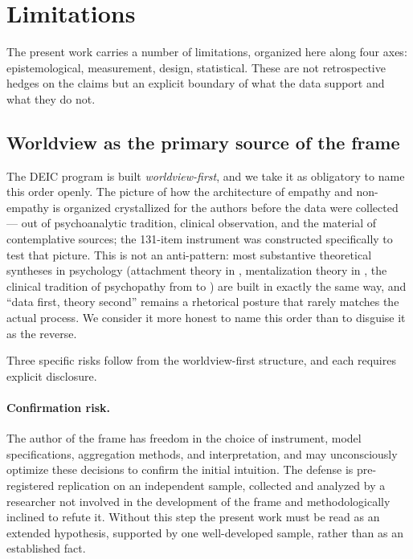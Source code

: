 \section{Limitations}
\label{sec:limitations}

The present work carries a number of limitations, organized here along four axes: epistemological, measurement, design, statistical. These are not retrospective hedges on the claims but an explicit boundary of what the data support and what they do not.

\subsection{Worldview as the primary source of the frame}
\label{subsec:worldview_first}

The DEIC program is built \emph{worldview-first}, and we take it as obligatory to name this order openly. The picture of how the architecture of empathy and non-empathy is organized crystallized for the authors before the data were collected --- out of psychoanalytic tradition, clinical observation, and the material of contemplative sources; the 131-item instrument was constructed specifically to test that picture. This is not an anti-pattern: most substantive theoretical syntheses in psychology (attachment theory in \citealp{bowlby1969}, mentalization theory in \citealp{fonagy2002}, the clinical tradition of psychopathy from \citealp{cleckley1941} to \citealp{hare1991}) are built in exactly the same way, and ``data first, theory second'' remains a rhetorical posture that rarely matches the actual process. We consider it more honest to name this order than to disguise it as the reverse.

Three specific risks follow from the worldview-first structure, and each requires explicit disclosure.

\paragraph{Confirmation risk.} The author of the frame has freedom in the choice of instrument, model specifications, aggregation methods, and interpretation, and may unconsciously optimize these decisions to confirm the initial intuition. The defense is pre-registered replication on an independent sample, collected and analyzed by a researcher not involved in the development of the frame and methodologically inclined to refute it. Without this step the present work must be read as an extended hypothesis, supported by one well-developed sample, rather than as an established fact.

